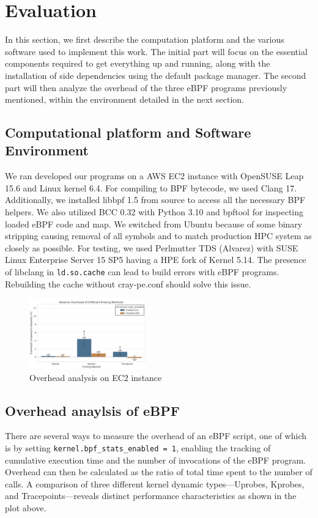\documentclass[sigconf]{acmart}
\begin{document}
\section{Evaluation} 
In this section, we first describe the computation platform and the various software used to implement this work. The initial part will focus on the essential components required to get everything up and running, along with the installation of side dependencies using the default package manager. The second part will then analyze the overhead of the three eBPF programs previously mentioned, within the environment detailed in the next section.

\subsection{Computational platform and Software Environment}
We ran developed our programs on a AWS EC2 instance with OpenSUSE Leap 15.6 and Linux kernel 6.4. For compiling to BPF bytecode, we used Clang 17. Additionally, we installed libbpf 1.5 from source to access all the necessary BPF helpers. We also utilized BCC 0.32 with Python 3.10 and bpftool for inspecting loaded eBPF code and map. We switched from Ubuntu because of some binary stripping causing removal of all symbols and to match production HPC system as closely as possible. For testing, we used Perlmutter TDS (Alvarez) with SUSE Linux Enterprise Server 15 SP5 having a HPE fork of Kernel 5.14. The presence of libclang in \texttt{ld.so.cache} can lead to build errors with eBPF programs. Rebuilding the cache without cray-pe.conf should solve this issue.

\begin{figure}
    \centering
    \includegraphics[width=0.45\textwidth]{images/overhead.png}
    \caption{Overhead analysis on EC2 instance}
    \label{fig:overhead}
\end{figure}

\subsection{Overhead anaylsis of eBPF}
There are several ways to measure the overhead of an eBPF script, one of which is by setting \texttt{kernel.bpf\_stats\_enabled = 1}, enabling the tracking of cumulative execution time and the number of invocations of the eBPF program. Overhead can then be calculated as the ratio of total time spent to the number of calls. A comparison of three different kernel dynamic types---Uprobes, Kprobes, and Tracepoints---reveals distinct performance characteristics as shown in the plot above. 
\end{document}
